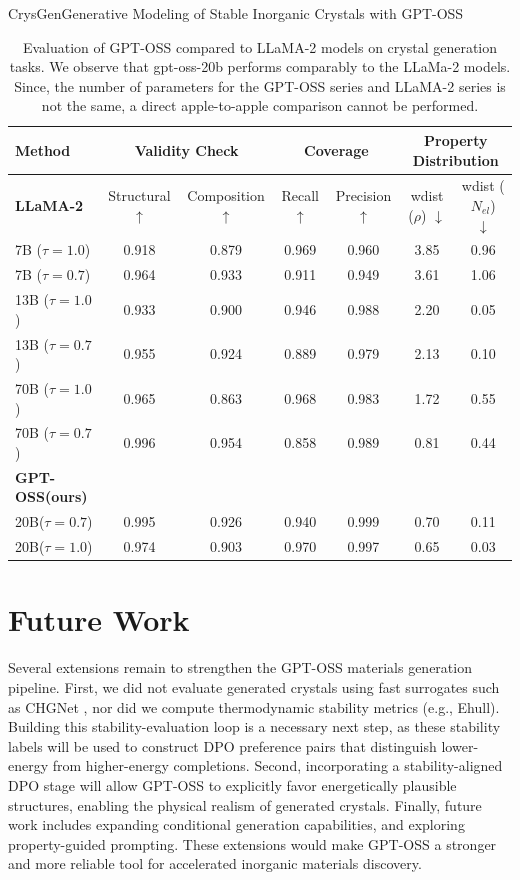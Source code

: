 \begin{teamsubmission}{CrysGen}{Generative Modeling of Stable Inorganic Crystals with GPT-OSS}
\begin{table}[ht!]
\centering
\begin{tabular}{l|cc|cc|cc}
\toprule
\textbf{Method} &
\multicolumn{2}{c}{\textbf{Validity Check}} &
\multicolumn{2}{c}{\textbf{Coverage}} &
\multicolumn{2}{c}{\textbf{Property Distribution}} \\
\midrule
\textbf{LLaMA-2} & Structural $\uparrow$ & Composition $\uparrow$ &
Recall $\uparrow$ & Precision $\uparrow$ &
wdist ($\rho$) $\downarrow$ & wdist ($N_{el}$) $\downarrow$
 \\
\midrule
7B ($\tau=1.0$)  & 0.918 & 0.879 & 0.969 & 0.960 & 3.85 & 0.96 \\
7B ($\tau=0.7$)  & 0.964 & 0.933 & 0.911 & 0.949 & 3.61 & 1.06 \\
13B ($\tau=1.0$) & 0.933 & 0.900 & 0.946 & 0.988 & 2.20 & 0.05 \\
13B ($\tau=0.7$) & 0.955 & 0.924 & 0.889 & 0.979 & 2.13 & 0.10 \\
70B ($\tau=1.0$) & 0.965 & 0.863 & 0.968 & 0.983 & 1.72 & 0.55 \\
70B ($\tau=0.7$) & 0.996 & {0.954} & 0.858 & 0.989 & 0.81 & 0.44 \\
\midrule
\textbf{GPT-OSS(ours)} \\
\midrule
20B($\tau=0.7$) & 0.995 & 0.926 & 0.940 & 0.999 & 0.70 & 0.11 \\
20B($\tau=1.0$) & 0.974 & 0.903 & 0.970 & 0.997 & 0.65 & 0.03 \\


\bottomrule
\end{tabular}
\caption{Evaluation of GPT-OSS compared to LLaMA-2 models on crystal generation tasks. We observe that gpt-oss-20b performs comparably to the LLaMa-2 models. Since, the number of parameters for the GPT-OSS series and LLaMA-2 series is not the same, a direct apple-to-apple comparison cannot be performed.}
\label{tab:gptoss_vs_llama}
\end{table}

\section*{Future Work}

Several extensions remain to strengthen the GPT-OSS materials generation pipeline. First, we did not evaluate generated crystals using fast surrogates such as CHGNet \cite{deng2023chgnet}, nor did we compute thermodynamic stability metrics (e.g., Ehull). Building this stability-evaluation loop is a necessary next step, as these stability labels will be used to construct DPO preference pairs that distinguish lower-energy from higher-energy completions.
Second, incorporating a stability-aligned DPO \cite{rafailov2023direct} stage will allow GPT-OSS to explicitly favor energetically plausible structures, enabling the physical realism of generated crystals.
Finally, future work includes expanding conditional generation capabilities, and exploring property-guided prompting. These extensions would make GPT-OSS a stronger and more reliable tool for accelerated inorganic materials discovery.


\end{teamsubmission}

